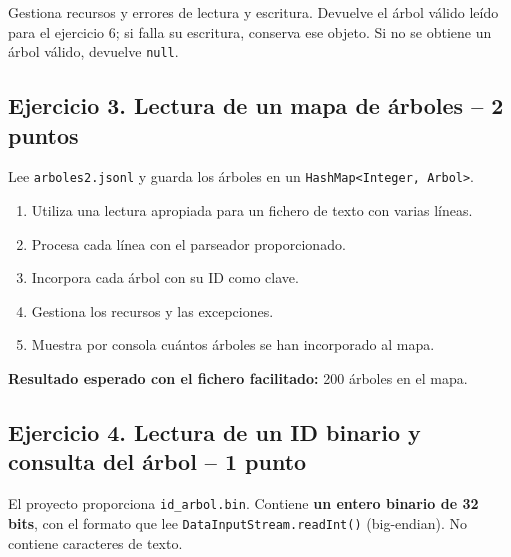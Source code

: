 \documentclass[a4paper,12pt]{article}
\begin{document}
Gestiona recursos y errores de lectura y escritura. Devuelve el árbol válido leído para el ejercicio 6; si falla su escritura, conserva ese objeto. Si no se obtiene un árbol válido, devuelve \texttt{null}.\par

\subsection*{\color{secondary}Ejercicio 3. Lectura de un mapa de árboles  --  2 puntos}

Lee \texttt{arboles2.jsonl} y guarda los árboles en un \texttt{H\allowbreak{}a\allowbreak{}s\allowbreak{}h\allowbreak{}M\allowbreak{}a\allowbreak{}p\allowbreak{}<\allowbreak{}I\allowbreak{}n\allowbreak{}t\allowbreak{}e\allowbreak{}g\allowbreak{}e\allowbreak{}r\allowbreak{},\allowbreak{} \allowbreak{}A\allowbreak{}r\allowbreak{}b\allowbreak{}o\allowbreak{}l\allowbreak{}>}.\par

\begin{enumerate}
\item Utiliza una lectura apropiada para un fichero de texto con varias líneas.
\item Procesa cada línea con el parseador proporcionado.
\item Incorpora cada árbol con su ID como clave.
\item Gestiona los recursos y las excepciones.
\item Muestra por consola cuántos árboles se han incorporado al mapa.
\end{enumerate}

\textbf{Resultado esperado con el fichero facilitado:} 200 árboles en el mapa.\par

\subsection*{\color{secondary}Ejercicio 4. Lectura de un ID binario y consulta del árbol  --  1 punto}

El proyecto proporciona \texttt{id\_arbol.bin}. Contiene \textbf{un entero binario de 32 bits}, con el formato que lee \texttt{D\allowbreak{}a\allowbreak{}t\allowbreak{}a\allowbreak{}I\allowbreak{}n\allowbreak{}p\allowbreak{}u\allowbreak{}t\allowbreak{}S\allowbreak{}t\allowbreak{}r\allowbreak{}e\allowbreak{}a\allowbreak{}m\allowbreak{}.\allowbreak{}r\allowbreak{}e\allowbreak{}a\allowbreak{}d\allowbreak{}I\allowbreak{}n\allowbreak{}t\allowbreak{}(\allowbreak{})} (big-endian). No contiene caracteres de texto.\par
\end{document}
